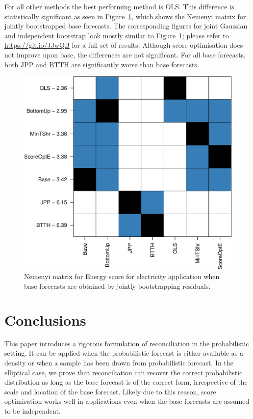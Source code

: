 \documentclass[11pt]{article}
\theoremstyle{definition}
\begin{document}
For all other methods the best performing method is OLS. This difference is statistically significant as seen in Figure~\ref{fig:nem_app_jb}, which shows the Nemenyi matrix for jointly bootstrapped base forecasts. The corresponding figures for joint Gaussian and independent bootstrap look mostly similar to Figure~\ref{fig:nem_app_jb}; please refer to \url{https://git.io/JJwQB} for a full set of results. Although score optimisation does not improve upon base, the differences are not significant. For all base forecasts, both JPP and BTTH are significantly worse than base forecasts.

\begin{figure}
	\centering
	\includegraphics[width=.4\textheight]{Figs/nemenyi_jb.pdf}
	\caption{Nemenyi matrix for Energy score for electricity application when base forecasts are obtained by jointly bootstrapping residuals.}
		\label{fig:nem_app_jb}
\end{figure}

\section{Conclusions}\label{sec:conclusion}

This paper introduces a rigorous formulation of reconciliation in the probabilistic setting. It can be applied when the probabilistic forecast is either available as a density or when a sample has been drawn from probabilistic forecast. In the elliptical case, we prove that reconciliation can recover the correct probabilistic distribution as long as the base forecast is of the correct form, irrespective of the scale and location of the base forecast. Likely due to this reason, score optimisation works well in applications even when the base forecasts are assumed to be independent.
\end{document}
